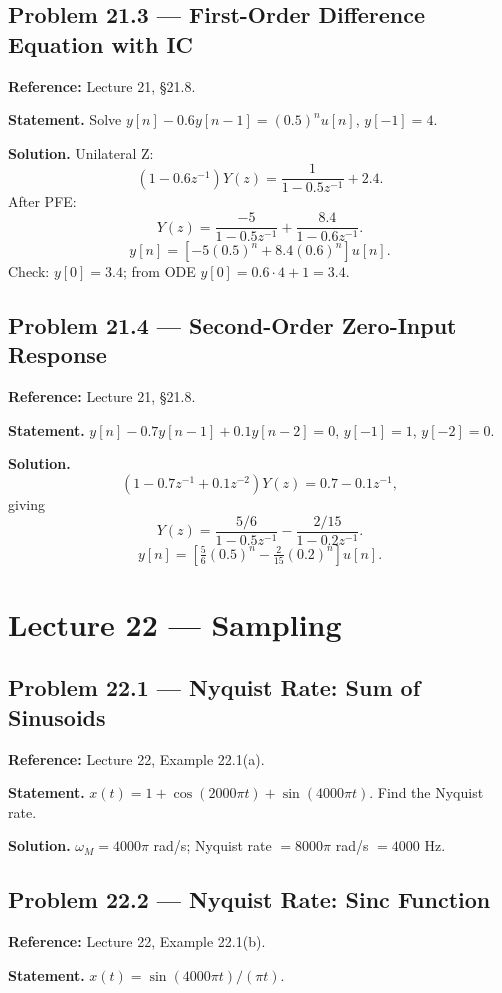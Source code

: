 \documentclass[11pt]{article}
\begin{document}
\subsection{Problem 21.3 --- First-Order Difference Equation with IC}
\textbf{Reference:} Lecture 21, \S 21.8.

\textbf{Statement.} Solve $y[n] - 0.6 y[n-1] = (0.5)^n u[n]$, $y[-1]=4$.

\textbf{Solution.} Unilateral Z:
\[
(1-0.6z^{-1})Y(z) = \frac{1}{1-0.5z^{-1}} + 2.4.
\]
After PFE:
\[
Y(z) = \frac{-5}{1-0.5z^{-1}} + \frac{8.4}{1-0.6z^{-1}}.
\]
\[
\boxed{y[n] = \left[-5(0.5)^n + 8.4(0.6)^n\right]u[n]}.
\]
Check: $y[0]=3.4$; from ODE $y[0] = 0.6\cdot 4 + 1 = 3.4$.

\subsection{Problem 21.4 --- Second-Order Zero-Input Response}
\textbf{Reference:} Lecture 21, \S 21.8.

\textbf{Statement.} $y[n] - 0.7 y[n-1] + 0.1 y[n-2] = 0$, $y[-1]=1$, $y[-2]=0$.

\textbf{Solution.}
\[
(1-0.7z^{-1}+0.1z^{-2})Y(z) = 0.7-0.1z^{-1},
\]
giving
\[
Y(z) = \frac{5/6}{1-0.5z^{-1}} - \frac{2/15}{1-0.2z^{-1}}.
\]
\[
\boxed{y[n] = \left[\tfrac{5}{6}(0.5)^n - \tfrac{2}{15}(0.2)^n\right]u[n]}.
\]

\section{Lecture 22 --- Sampling}

\subsection{Problem 22.1 --- Nyquist Rate: Sum of Sinusoids}
\textbf{Reference:} Lecture 22, Example 22.1(a).

\textbf{Statement.} $x(t) = 1 + \cos(2000\pi t) + \sin(4000\pi t)$. Find the Nyquist rate.

\textbf{Solution.} $\omega_M = 4000\pi$ rad/s; Nyquist rate $=8000\pi$ rad/s $=4000$ Hz.

\subsection{Problem 22.2 --- Nyquist Rate: Sinc Function}
\textbf{Reference:} Lecture 22, Example 22.1(b).

\textbf{Statement.} $x(t) = \sin(4000\pi t)/(\pi t)$.
\end{document}
